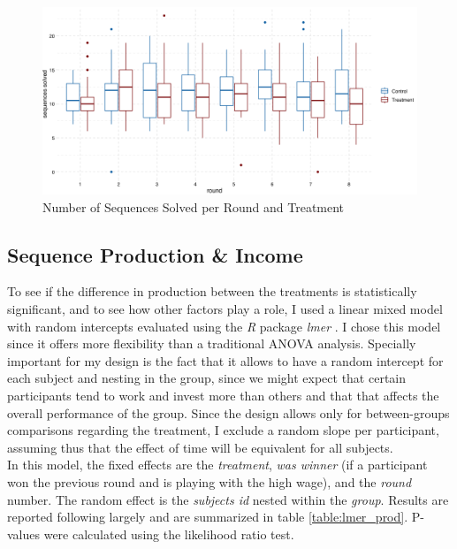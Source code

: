 \begin{figure}
    \centering
    \includegraphics[width=\textwidth]{graphs/production_boxplot.png}
    \caption{Number of Sequences Solved per Round and Treatment}
    \label{fig:production_boxplot}
\end{figure}

\subsection{Sequence Production \& Income}
To see if the difference in production between the treatments is statistically significant, and to see how other factors play a role, I used a linear mixed model with random intercepts evaluated using the \textit{R} package \textit{lmer} \citep{bates2015}. I chose this model since it offers more flexibility than a traditional ANOVA analysis. Specially important for my design is the fact that it allows to have a random intercept for each subject and nesting in the group, since we might expect that certain participants tend to work and invest more than others and that that affects the overall performance of the group. Since the design allows only for between-groups comparisons regarding the treatment, I exclude a random slope per participant, assuming thus that the effect of time will be equivalent for all subjects.\\

In this model, the fixed effects are the \textit{treatment}, \textit{was winner} (if a participant won the previous round and is playing with the high wage), and the \textit{round} number. The random effect is the \textit{subjects id} nested within the \textit{group}. Results are reported following largely \cite{barr2013} and are summarized in table \ref{table:lmer_prod}. P-values were calculated using the likelihood ratio test.\\

